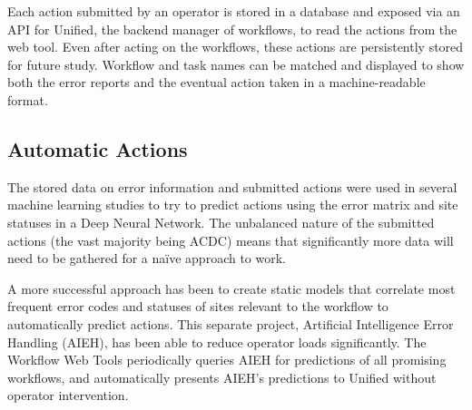 Each action submitted by an operator is stored in a database
and exposed via an API for Unified, the backend manager of workflows,
to read the actions from the web tool.
Even after acting on the workflows,
these actions are persistently stored for future study.
Workflow and task names can be matched and displayed
to show both the error reports and the eventual action taken in a machine-readable format.

\subsection{Automatic Actions}

The stored data on error information and submitted actions
were used in several machine learning studies to try to predict actions using
the error matrix and site statuses in a Deep Neural Network.
The unbalanced nature of the submitted actions (the vast majority being ACDC)
means that significantly more data will need to be gathered for a na\"ive approach to work.

A more successful approach has been to create static models that correlate
most frequent error codes and statuses of sites relevant to the workflow to
automatically predict actions.
This separate project, Artificial Intelligence Error Handling (AIEH),
has been able to reduce operator loads significantly.
The Workflow Web Tools periodically queries AIEH for predictions of all promising workflows,
and automatically presents AIEH's predictions to Unified without operator intervention.
